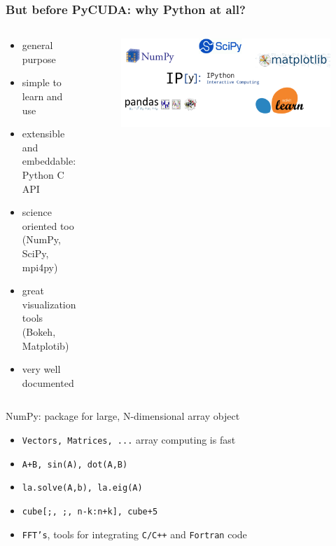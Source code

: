 \documentclass[]{beamer}
\begin{document}

\begin{frame}
\frametitle{But before PyCUDA: why Python at all?}
\begin{columns}
    \begin{column}{0.75\textwidth}
    \begin{itemize}
        \item general purpose \dCooley
        \item simple to learn and use \dSmiley %
        \item extensible and embeddable: Python C API
        \item science oriented too (NumPy, SciPy, mpi4py)
        \item great visualization tools (Bokeh, Matplotib) %
        \item very well documented 
    \end{itemize}
    \end{column}
    \begin{column}{.43\textwidth}
        \begin{figure}
            \begin{minipage}{1.\textwidth}
                \includegraphics[width=1.\textwidth]{pics/logo-stack-python}
             \end{minipage}
        \end{figure}
    \end{column}
    \hspace*{1.2cm}
\end{columns} 
    \vfill
    \vspace*{-0.1cm}
    \begin{block}{NumPy: package for large, N-dimensional array object \dCooley}
    \begin{itemize}
        \item \small \texttt{Vectors, Matrices, ...} array computing is fast
        \item \small \texttt{A+B, sin(A), dot(A,B)}
        \item \small \texttt{la.solve(A,b), la.eig(A)}
        \item \small \texttt{cube[;, ;, n-k:n+k], cube+5}
        \item \small \texttt{FFT's}, tools for integrating \texttt{C/C++} and \texttt{Fortran} code
    \end{itemize}   
\end{block}


\end{frame}
\end{document}
